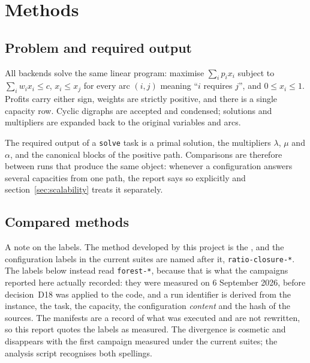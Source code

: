 \section{Methods}
\label{sec:methods}

\subsection{Problem and required output}

All backends solve the same linear program: maximise $\sum_i p_i x_i$ subject to
$\sum_i w_i x_i \le c$, $x_i \le x_j$ for every arc $(i,j)$ meaning ``$i$
requires $j$'', and $0 \le x_i \le 1$. Profits carry either sign, weights are
strictly positive, and there is a single capacity row. Cyclic digraphs are
accepted and condensed; solutions and multipliers are expanded back to the
original variables and arcs.

The required output of a \texttt{solve} task is a primal solution, the
multipliers $\lambda$, $\mu$ and $\alpha$, and the canonical blocks of the
positive path. Comparisons are therefore between runs that produce the same
object: whenever a configuration answers several capacities from one path, the
report says so explicitly and section~\ref{sec:scalability} treats it separately.

\subsection{Compared methods}

A note on the labels. The method developed by this project is the \FS{}, and
the configuration labels in the current suites are named after it,
\texttt{ratio-closure-*}. The labels below instead read \texttt{forest-*},
because that is what the campaigns reported here actually recorded: they were
measured on 6 September 2026, before decision~D18 was applied to the code, and a
run identifier is derived from the instance, the task, the capacity, the
configuration \emph{content} and the hash of the sources. The manifests are a
record of what was executed and are not rewritten, so this report quotes the
labels as measured. The divergence is cosmetic and disappears with the first
campaign measured under the current suites; the analysis script recognises both
spellings.

